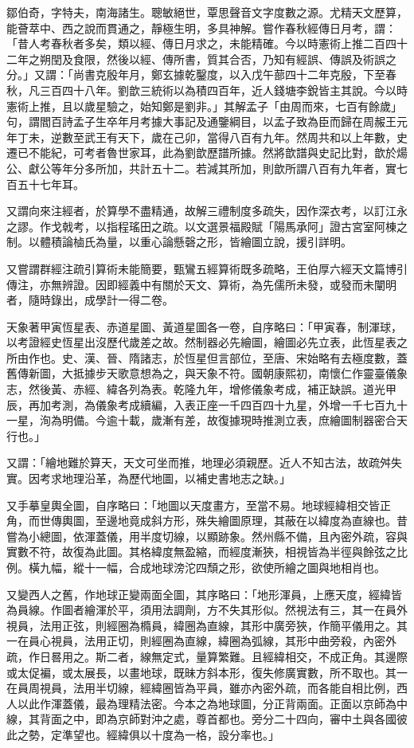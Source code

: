 \begin{pinyinscope}
鄒伯奇，字特夫，南海諸生。聰敏絕世，覃思聲音文字度數之源。尤精天文歷算，能薈萃中、西之說而貫通之，靜極生明，多具神解。嘗作春秋經傳日月考，謂：「昔人考春秋者多矣，類以經、傳日月求之，未能精確。今以時憲術上推二百四十二年之朔閏及食限，然後以經、傳所書，質其合否，乃知有經誤、傳誤及術誤之分。」又謂：「尚書克殷年月，鄭玄據乾鑿度，以入戊午蔀四十二年克殷，下至春秋，凡三百四十八年。劉歆三統術以為積四百年，近人錢塘李銳皆主其說。今以時憲術上推，且以歲星驗之，始知鄭是劉非。」其解孟子「由周而來，七百有餘歲」句，謂閻百詩孟子生卒年月考據大事記及通鑒綱目，以孟子致為臣而歸在周赧王元年丁未，逆數至武王有天下，歲在己卯，當得八百有九年。然周共和以上年數，史遷已不能紀，可考者魯世家耳，此為劉歆歷譜所據。然將歆譜與史記比對，歆於煬公、獻公等年分多所加，共計五十二。若減其所加，則歆所謂八百有九年者，實七百五十七年耳。

又謂向來注經者，於算學不盡精通，故解三禮制度多疏失，因作深衣考，以訂江永之謬。作戈戟考，以指程瑤田之疏。以文選景福殿賦「陽馬承阿」證古宮室阿棟之制。以體積論樐氏為量，以重心論懸磬之形，皆繪圖立說，援引詳明。

又嘗謂群經注疏引算術未能簡要，甄鸞五經算術既多疏略，王伯厚六經天文篇博引傳注，亦無辨證。因即經義中有關於天文、算術，為先儒所未發，或發而未闡明者，隨時錄出，成學計一得二卷。

天象著甲寅恆星表、赤道星圖、黃道星圖各一卷，自序略曰：「甲寅春，制渾球，以考證經史恆星出沒歷代歲差之故。然制器必先繪圖，繪圖必先立表，此恆星表之所由作也。史、漢、晉、隋諸志，於恆星但言部位，至唐、宋始略有去極度數，蓋舊傳新圖，大抵據步天歌意想為之，與天象不符。國朝康熙初，南懷仁作靈臺儀象志，然後黃、赤經、緯各列為表。乾隆九年，增修儀象考成，補正缺誤。道光甲辰，再加考測，為儀象考成續編，入表正座一千四百四十九星，外增一千七百九十一星，洵為明備。今逾十載，歲漸有差，故復據現時推測立表，庶繪圖制器密合天行也。」

又謂：「繪地難於算天，天文可坐而推，地理必須親歷。近人不知古法，故疏舛失實。因考求地理沿革，為歷代地圖，以補史書地志之缺。」

又手摹皇輿全圖，自序略曰：「地圖以天度畫方，至當不易。地球經緯相交皆正角，而世傳輿圖，至邊地竟成斜方形，殊失繪圖原理，其蔽在以緯度為直線也。昔嘗為小總圖，依渾蓋儀，用半度切線，以顯跡象。然州縣不備，且內密外疏，容與實數不符，故復為此圖。其格緯度無盈縮，而經度漸狹，相視皆為半徑與餘弦之比例。橫九幅，縱十一幅，合成地球滂沱四頹之形，欲使所繪之圖與地相肖也。

又變西人之舊，作地球正變兩面全圖，其序略曰：「地形渾員，上應天度，經緯皆為員線。作圖者繪渾於平，須用法調劑，方不失其形似。然視法有三，其一在員外視員，法用正弦，則經圈為橢員，緯圈為直線，其形中廣旁狹，作簡平儀用之。其一在員心視員，法用正切，則經圈為直線，緯圈為弧線，其形中曲旁殺，內密外疏，作日晷用之。斯二者，線無定式，量算繁難。且經緯相交，不成正角。其邊際或太促褊，或太展長，以畫地球，既昧方斜本形，復失修廣實數，所不取也。其一在員周視員，法用半切線，經緯圈皆為平員，雖亦內密外疏，而各能自相比例，西人以此作渾蓋儀，最為理精法密。今本之為地球圖，分正背兩面。正面以京師為中線，其背面之中，即為京師對沖之處，尊首都也。旁分二十四向，審中土與各國彼此之勢，定準望也。經緯俱以十度為一格，設分率也。」


\end{pinyinscope}
